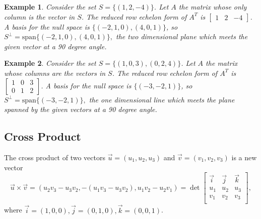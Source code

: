 \documentclass[10pt]{article}
\theoremstyle{plain}
\theoremstyle{box}
\newtheorem{example}{Example}
\begin{document}
\begin{example}
Consider the set  $S=\{(1,2,-4)\}$. Let $A$ the matrix whose only column is the vector in $S$. The reduced row echelon form of $A^T$ is $\begin{bmatrix}1&2&-4\end{bmatrix}$. A basis for the null space is $\{(-2,1,0), (4,0,1)\}$, so $S^\perp = \text{span}\{(-2,1,0), (4,0,1)\},$ the two dimensional plane which meets the given vector at a 90 degree angle.
\end{example}

\begin{example}
Consider the set  $S=\{(1,0,3),(0,2,4)\}$. Let $A$ the matrix whose columns are the vectors in $S$. The reduced row echelon form of $A^T$ is $\begin{bmatrix}1&0&3\\0&1&2\end{bmatrix}$. A basis for the null space is $\{(-3,-2,1)\}$, so $S^\perp = \text{span}\{(-3,-2,1)\},$ the one dimensional line which meets the plane spanned by the given vectors at a 90 degree angle.
\end{example}



\subsection{Cross Product}
The cross product of two vectors $\vec u =(u_1,u_2,u_3)$ and $\vec v = (v_1,v_2,v_3)$ is a new vector $$\vec u\times \vec v = (u_2v_3-u_3v_2,-(u_1v_3-u_3v_2),u_1v_2-u_2v_1) = \det\begin{bmatrix}\vec i & \vec j&\vec k\\ u_1&u_2&u_3\\ v_1&v_2&v_3\\\end{bmatrix},$$ where $\vec i = (1,0,0), \vec j = (0,1,0), \vec k = (0,0,1)$.  
\end{document}
